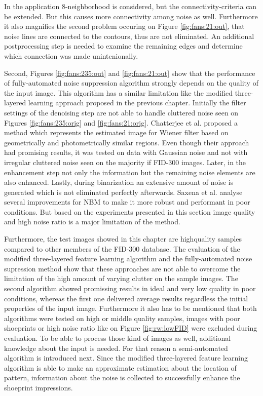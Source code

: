 \documentclass[draft,final]{vutinfth} %
\begin{document}
In the application 8-neighborhood is considered, but the connectivity-criteria can be extended.
But this causes more connectivity among noise as well.
Furthermore it also magnifies the second problem occuring on Figure \ref{fig:fans:21:out}, that noise lines are connected to the contours, thus are not eliminated.
An additional postprocessing step is needed to examine the remaining edges and determine which connection was made unintenionally.
\par
Second, Figures \ref{fig:fans:235:out} and \ref{fig:fans:21:out} show that the performance of fully-automated noise suppression algorithm strongly depends on the quality of the input image.
This algorithm has a similar limitation like the modified three-layered learning approach proposed in the previous chapter.
Initially the filter settings of the denoising step are not able to handle cluttered noise seen on Figures \ref{fig:fans:235:orig} and \ref{fig:fans:21:orig}.
Chatterjee et al. \cite{chatterjee2011patch} proposed a method which represents the estimated image for Wiener filter based on geometrically and photometrically similar regions.
Even though their approach had promising results, it was tested on data with Gaussian noise and not with irregular cluttered noise seen on the majority if FID-300 images.
Later, in the enhancement step not only the information but the remaining noise elements are also enhanced.
Lastly, during binarization an extensive amount of noise is generated which is  not eliminated perfectly afterwards.
Saxena et al. \cite{saxena2019niblack} analyse several improvements for NBM to make it more robust and performant in poor conditions.
But based on the experiments presented in this section image quality and high noise ratio is a major limitation of the method.

\par
Furthermore, the test images showed in this chapter are highquality samples compared to other members of the FID-300 database.
The evaluation of the modified three-layered feature learning algorithm and the fully-automated noise supression method show that these approaches are not able to overcome the limitation of the high amount of varying clutter on the sample images.
The second algorithm showed promissing results in ideal and very low quality in poor conditions, whereas the first one delivered average results regardless the initial properties of the input image.
Furthermore it also has to be mentioned that both algorithms were tested on high or middle quality samples, images with poor shoeprints or high noise ratio like on Figure \ref{fig:rw:lowFID} were excluded during evaluation.
To be able to process those kind of images as well, additional knowledge about the input is needed.
For that reason a semi-automated algorithm is introduced next.
Since the modified three-layered feature learning algorithm is able to make an approximate estimation about the location of pattern, information about the noise is collected to successfully enhance the shoeprint impressions.
\end{document}
